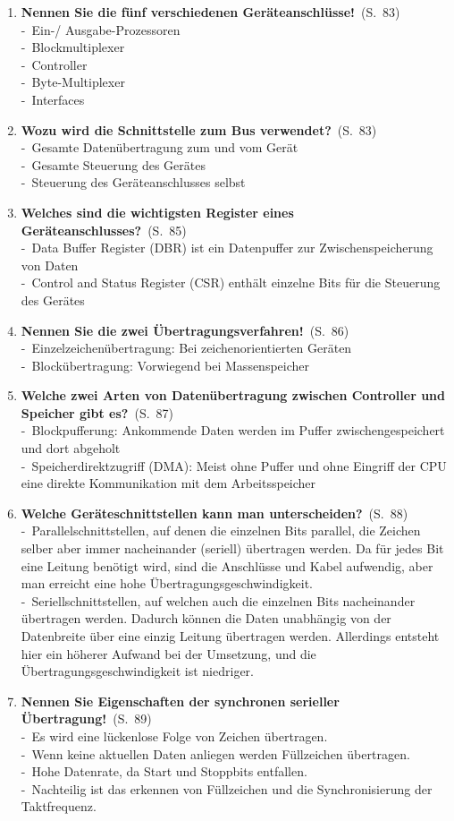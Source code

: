 \documentclass[a4paper,12pt]{article}
\newcommand{\question}[3]{\pagebreak[3]\item {\textbf{#1?}}\ (S.\ #2)#3}
\newcommand{\statement}[3]{\pagebreak[3]\item {\textbf{#1!}}\ (S.\ #2)#3}
\newcommand{\catchword}[1]{\\-\ #1}
\newcommand{\page}[1]{#1}
\begin{document}
\begin{enumerate}
  \statement{Nennen Sie die fünf verschiedenen Geräteanschlüsse}{\page{83}}
  {
    \catchword{Ein-/ Ausgabe-Prozessoren}
    \catchword{Blockmultiplexer}
    \catchword{Controller}
    \catchword{Byte-Multiplexer}
    \catchword{Interfaces}
  }

  \question{Wozu wird die Schnittstelle zum Bus verwendet}{\page{83}}
  {
    \catchword{Gesamte Datenübertragung zum und vom Gerät}
    \catchword{Gesamte Steuerung des Gerätes}
    \catchword{Steuerung des Geräteanschlusses selbst}
  }

  \question{Welches sind die wichtigsten Register eines Geräteanschlusses}{\page{85}}
  {
    \catchword{Data Buffer Register (DBR) ist ein Datenpuffer zur Zwischenspeicherung von Daten}
    \catchword{Control and Status Register (CSR) enthält einzelne Bits für die Steuerung des Gerätes}
  }

  \statement{Nennen Sie die zwei Übertragungsverfahren}{\page{86}}
  {
    \catchword{Einzelzeichenübertragung: Bei zeichenorientierten Geräten}
    \catchword{Blockübertragung: Vorwiegend bei Massenspeicher}
  }

  \question{Welche zwei Arten von Datenübertragung zwischen Controller und Speicher gibt es}{\page{87}}
  {
    \catchword{Blockpufferung: Ankommende Daten werden im Puffer zwischengespeichert und dort abgeholt}
    \catchword{Speicherdirektzugriff (DMA): Meist ohne Puffer und ohne Eingriff der CPU eine
               direkte Kommunikation mit dem Arbeitsspeicher}
  }

  \question{Welche Geräteschnittstellen kann man unterscheiden}{\page{88}}
  {
    \catchword{Parallelschnittstellen, auf denen die einzelnen Bits parallel, die Zeichen selber 
               aber immer nacheinander (seriell) übertragen werden. Da für jedes Bit eine Leitung benötigt 
               wird, sind die Anschlüsse und Kabel aufwendig, aber man erreicht eine hohe
               Übertragungsgeschwindigkeit.}
    \catchword{Seriellschnittstellen, auf welchen auch die einzelnen Bits nacheinander übertragen werden. 
               Dadurch können die Daten unabhängig von der Datenbreite über eine einzig Leitung
               übertragen werden. Allerdings entsteht hier ein höherer Aufwand bei der Umsetzung, und 
               die Übertragungsgeschwindigkeit ist niedriger.}
  }

  \statement{Nennen Sie Eigenschaften der synchronen serieller Übertragung}{\page{89}}
  {
    \catchword{Es wird eine lückenlose Folge von Zeichen übertragen.}
    \catchword{Wenn keine aktuellen Daten anliegen werden Füllzeichen übertragen.}
    \catchword{Hohe Datenrate, da Start und Stoppbits entfallen.}
    \catchword{Nachteilig ist das erkennen von Füllzeichen und die Synchronisierung der Taktfrequenz.}
  }


\end{enumerate}
\end{document}
